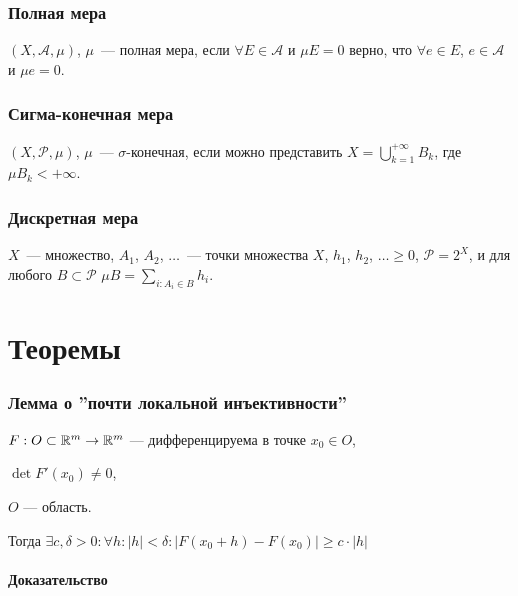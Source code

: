 \documentclass{article}
\begin{document}
    \section{Полная мера}
    
        $(X, \mathcal{A}, \mu)$, $\mu$~--- полная мера, если $\forall E \in \mathcal{A}$ и $\mu E = 0$ верно, что $\forall e \in E$, $e \in \mathcal{A}$ и $\mu e = 0$.
        
    \newpage
    
    \section{Сигма-конечная мера}
    
        $(X, \mathcal{P}, \mu)$, $\mu$~--- $\sigma$-конечная, если можно представить $X = \bigcup\limits^{+\infty}_{k = 1} B_k$, где $\mu B_k < +\infty$.
        
    \newpage
    
    \section{Дискретная мера}
    
        $X$~--- множество, $A_1$, $A_2$, $\ldots$~--- точки множества $X$, $h_1$, $h_2$, $\ldots \geq 0$, $\mathcal{P} = 2^X$, и для любого $B \subset \mathcal{P}$ $\mu B = \sum\limits_{i : A_i \in B} h_i$.
        
\newpage

\part{Теоремы}

    \newpage
    
    \section{Лемма о ''почти локальной инъективности''}
    
        $F : O \subset \mathbb{R}^m \rightarrow \mathbb{R}^m$ --- дифференцируема в точке $x_0 \in O$, 
        
        $\det F'(x_0) \neq 0$,
        
        $O$ --- область.
        
        Тогда $\exists c, \delta > 0 : \forall h : \left| h \right| < \delta : \left| F(x_0 + h) - F(x_0) \right| \geq c \cdot \left| h \right|$
        
        \subsection{Доказательство}
        
\end{document}
